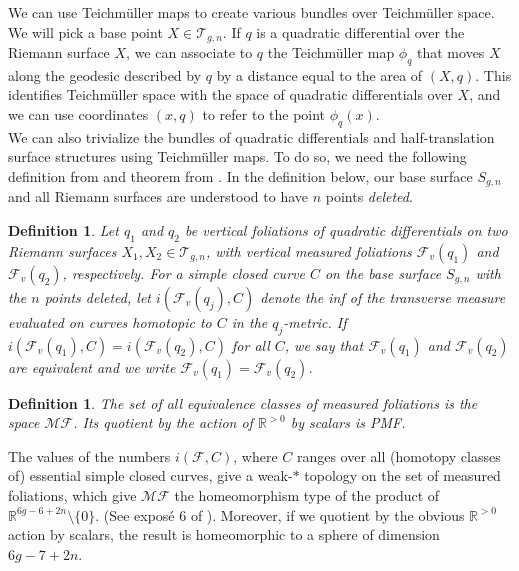 \documentclass[12pt]{article}
\newtheorem{definition}[theorem]{Definition}
\newcommand{\rr}{\mathbb{R}}
\begin{document}
\noindent We can use Teichm\"uller maps to create various bundles over Teichm\"uller space. We will pick a base point $X \in \mathcal{T}_{g,n}$. If $q$ is a quadratic differential over the Riemann surface $X$, we can associate to $q$ the Teichm\"uller map $\phi_q$ that moves $X$ along the geodesic described by $q$ by a distance equal to the area of $(X,q)$. This identifies Teichm\"uller space with the space of quadratic differentials over $X$, and we can use coordinates $(x,q)$ to refer to the point $\phi_q(x)$.\\

\noindent We can also trivialize the bundles of quadratic differentials and half-translation surface structures using Teichm\"uller maps. To do so, we need the following definition from \cite{FLP} and theorem from \cite{HM}. In the definition below, our base surface $S_{g,n}$ and all Riemann surfaces are understood to have $n$ points \emph{deleted}.

\begin{definition}Let $q_1$ and $q_2$ be vertical foliations of quadratic differentials on two Riemann surfaces $X_1, X_2 \in \mathcal{T}_{g,n}$, with vertical measured foliations $\mathcal{F}_v(q_1)$ and $\mathcal{F}_v(q_2)$, respectively. For a simple closed curve $C$ on the base surface $S_{g,n}$ with the $n$ points \emph{deleted}, let $i(\mathcal{F}_v(q_j),C)$ denote the inf of the transverse measure evaluated on curves homotopic to $C$ in the $q_j$-metric. If $i(\mathcal{F}_v(q_1),C) = i(\mathcal{F}_v(q_2),C)$ for all $C$, we say that $\mathcal{F}_v(q_1)$ and $\mathcal{F}_v(q_2)$ are equivalent and we write $\mathcal{F}_v(q_1) = \mathcal{F}_v(q_2)$.
\end{definition}

\begin{definition}The set of all equivalence classes of measured foliations is the space $\mathcal{MF}$. Its quotient by the action of $\rr^{>0}$ by scalars is \emph{PMF}.\end{definition}

\noindent The values of the numbers $i(\mathcal{F},C)$, where $C$ ranges over all (homotopy classes of) essential simple closed curves, give a weak-$*$ topology on the set of measured foliations, which give $\mathcal{MF}$ the homeomorphism type of the product of $\rr^{6g - 6 + 2n} \setminus \{ 0 \}.$ (See expos\'{e} 6 of \cite{FLP}). Moreover, if we quotient by the obvious $\rr^{>0}$ action by scalars, the result is homeomorphic to a sphere of dimension $6g-7+2n$.\\
\end{document}
